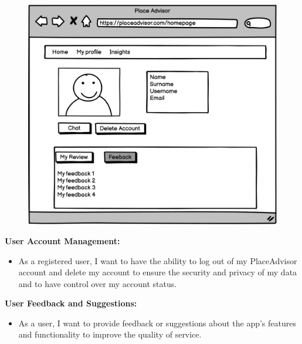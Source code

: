 \documentclass[../main.tex]{subfiles}
\begin{document}
\begin{itemize}
\begin{figure}[h]
\begin{multicols}{2}
    \includegraphics[width=\linewidth]{../figures/mockup/US8 copy.png}\par 
    \end{multicols}
\end{figure}
  
\end{itemize}

\textbf{User Account Management:}
\begin{itemize}
  \item As a registered user, I want to have the ability to log out of my PlaceAdvisor account and delete my account to ensure the security and privacy of my data and to have control over my account status.
\end{itemize}

\pagebreak

\textbf{User Feedback and Suggestions:}
\begin{itemize}
  \item As a user, I want to provide feedback or suggestions about the app's features and functionality to improve the quality of service.
\end{itemize}
\end{document}

